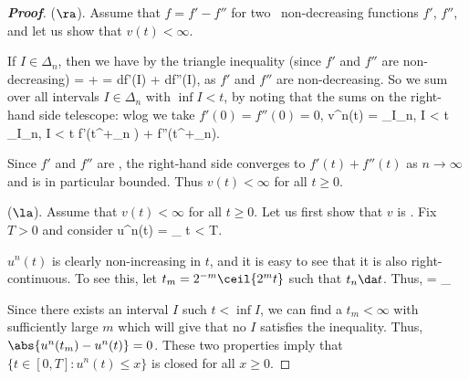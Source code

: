 \begin{proof}[\bf Proof]%
($\ra$). Assume that $f = f' -f''$ for two \cadlag\ non-decreasing functions $f'$, $f''$, and let us show that $v(t) < \infty$.

If $I \in \Delta_n$, then we have by the triangle inequality (since $f'$ and $f''$ are non-decreasing)
\be
{} =  \leq {} +  =  df'(I) + df''(I),
\ee
as $f'$ and $f''$ are non-decreasing. So we sum over all intervals $I \in \Delta_n$ with $\inf I < t$, by noting that the sums on the right-hand side telescope: wlog we take $f'(0) = f''(0) = 0$,
\be
v^n(t) = \sum_{I\in \Delta_n, \inf I < t}  \leq \sum_{I\in \Delta_n, \inf I < t}  \leq f'(t^+_n ) + f''(t^+_n).
\ee

Since $f'$ and $f''$ are \cadlag, the right-hand side converges to $f'(t) + f''(t)$ as $n \to \infty$ and is in particular bounded. Thus $v(t) < \infty$ for all $t \geq 0$.

($\la$). Assume that $v(t) < \infty$ for all $t \geq 0$. Let us first show that $v$ is \cadlag. Fix $T > 0$ and consider
\be
u^n(t) = \sum_{}  \quad{}t < T.
\ee

$u^n(t)$ is clearly non-increasing in $t$, and it is easy to see that it is also right-continuous. To see this, let $t_m = 2^{-m}\ceil{2^m t}$ such that $t_n \da t$. Thus,%
\be
{} = \sum_{}  %
\ee

Since there exists an interval $I$ such $t < \inf I$, we can find a $t_m < \infty$ with sufficiently large $m$ which will give that no $I$ satisfies the inequality. Thus, $\abs{u^n(t_m) - u^n(t)} = 0$. These two properties imply that $\{t \in [0, T] : u^n(t) \leq x\}$ is closed for all $x \geq 0$. %



\end{proof}
